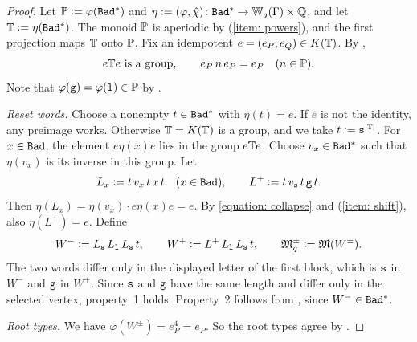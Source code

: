 \begin{proof}
  Let $\mathbb{P} \mathrel{\vcentcolon=} \varphi(\mathtt{Bad}^{*})$ and $\eta \mathrel{\vcentcolon=} (\varphi, \hat\chi) \colon \mathtt{Bad}^{*} \to \mathbb{W}_{q}(\Gamma) \times \mathbb{Q}$, and let $\mathbb{T} \mathrel{\vcentcolon=} \eta(\mathtt{Bad}^{*})$.
  The monoid $\mathbb{P}$ is aperiodic by (\ref{item: powers}), and the first projection maps $\mathbb{T}$ onto $\mathbb{P}$.
  Fix an idempotent $e = (e_P, e_Q) \in K(\mathbb{T})$.
  By ,
  \begin{equation}\label{equation: collapse}
    e\mathbb{T} e \text{ is a group}, \qquad e_P\, n\, e_P = e_P \quad (n \in \mathbb{P}).
  \end{equation}
  Note that $\varphi(\mathtt{g}) = \varphi(\mathtt{l}) \in \mathbb{P}$ by .

  \emph{Reset words.}
  Choose a nonempty $t \in \mathtt{Bad}^{*}$ with $\eta(t) = e$.
  If $e$ is not the identity, any preimage works.
  Otherwise $\mathbb{T} = K(\mathbb{T})$ is a group, and we take $t \mathrel{\vcentcolon=} \mathtt{s}^{\lvert \mathbb{T}\rvert}$.
  For $x \in \mathtt{Bad}$, the element $e\eta(x)e$ lies in the group $e\mathbb{T} e$.
  Choose $v_x \in \mathtt{Bad}^{*}$ such that $\eta(v_x)$ is its inverse in this group.
  Let
  \[
    L_x \mathrel{\vcentcolon=} t\, v_x\, t\, x\, t \quad (x \in \mathtt{Bad}),
    \qquad
    L^{+} \mathrel{\vcentcolon=} t\, v_{\mathtt{s}}\, t\, \mathtt{g}\, t.
  \]
  Then $\eta(L_x) = \eta(v_x) \cdot e\eta(x)e = e$.
  By \eqref{equation: collapse} and (\ref{item: shift}), also $\eta(L^{+}) = e$.
  Define
  \[
    W^{-} \mathrel{\vcentcolon=} L_{\mathtt{s}}\, L_{\mathtt{l}}\, L_{\mathtt{s}}\, t,
    \qquad
    W^{+} \mathrel{\vcentcolon=} L^{+}\, L_{\mathtt{l}}\, L_{\mathtt{s}}\, t,
    \qquad
    \mathfrak{M}^{\pm}_q \mathrel{\vcentcolon=} \mathfrak{M}(W^{\pm}).
  \]
  The two words differ only in the displayed letter of the first block, which is $\mathtt{s}$ in $W^{-}$ and $\mathtt{g}$ in $W^{+}$.
  Since $\mathtt{s}$ and $\mathtt{g}$ have the same length and differ only in the selected vertex, property~1 holds.
  Property~2 follows from , since $W^{-} \in \mathtt{Bad}^{*}$.

  \emph{Root types.}
  We have $\varphi(W^{\pm}) = e_P^{4} = e_P$.
  So the root types agree by .


\end{proof}

